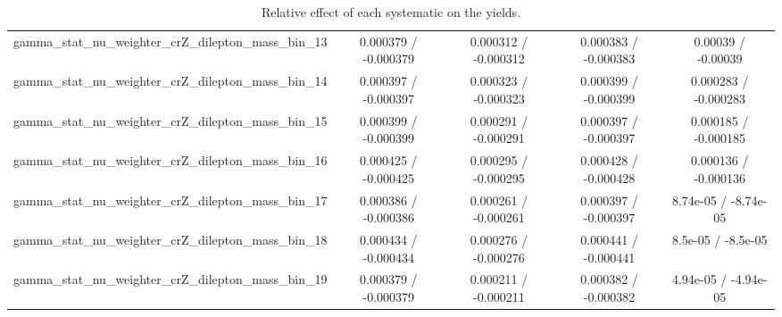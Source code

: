 \documentclass[10pt]{article}
\begin{document}
\begin{table}[htbp]
\begin{center}
\begin{tabular}{|c|c|c|c|c|}
  gamma_stat_nu_weighter_crZ_dilepton_mass_bin_13 & 0.000379 / -0.000379 & 0.000312 / -0.000312 & 0.000383 / -0.000383 & 0.00039 / -0.00039 \\ 
  gamma_stat_nu_weighter_crZ_dilepton_mass_bin_14 & 0.000397 / -0.000397 & 0.000323 / -0.000323 & 0.000399 / -0.000399 & 0.000283 / -0.000283 \\ 
  gamma_stat_nu_weighter_crZ_dilepton_mass_bin_15 & 0.000399 / -0.000399 & 0.000291 / -0.000291 & 0.000397 / -0.000397 & 0.000185 / -0.000185 \\ 
  gamma_stat_nu_weighter_crZ_dilepton_mass_bin_16 & 0.000425 / -0.000425 & 0.000295 / -0.000295 & 0.000428 / -0.000428 & 0.000136 / -0.000136 \\ 
  gamma_stat_nu_weighter_crZ_dilepton_mass_bin_17 & 0.000386 / -0.000386 & 0.000261 / -0.000261 & 0.000397 / -0.000397 & 8.74e-05 / -8.74e-05 \\ 
  gamma_stat_nu_weighter_crZ_dilepton_mass_bin_18 & 0.000434 / -0.000434 & 0.000276 / -0.000276 & 0.000441 / -0.000441 & 8.5e-05 / -8.5e-05 \\ 
  gamma_stat_nu_weighter_crZ_dilepton_mass_bin_19 & 0.000379 / -0.000379 & 0.000211 / -0.000211 & 0.000382 / -0.000382 & 4.94e-05 / -4.94e-05 \\ 
\hline 
\end{tabular} 
\caption{Relative effect of each systematic on the yields.} 
\end{center} 
\end{table} 
\end{document}
